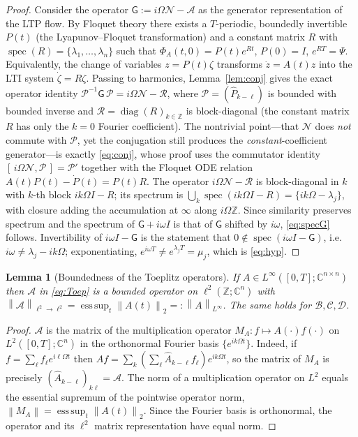 \documentclass{amsart}
\newtheorem{lemma}{Lemma}
\theoremstyle{definition}
\DeclareMathOperator{\spec}{spec}
\DeclareMathOperator{\diag}{diag}
\newcommand{\C}{\mathbb{C}}
\newcommand{\Z}{\mathbb{Z}}
\newcommand{\norm}[1]{\left\lVert#1\right\rVert}
\newcommand{\Acal}{\mathcal{A}}
\newcommand{\Bcal}{\mathcal{B}}
\newcommand{\Ccal}{\mathcal{C}}
\newcommand{\Dcal}{\mathcal{D}}
\newcommand{\Ncal}{\mathcal{N}}
\begin{document}
\begin{proof}
Consider the operator $\mathsf G:=i\Omega\Ncal-\Acal$ as the generator
representation of the LTP flow. By Floquet theory there exists a $T$-periodic,
boundedly invertible $P(t)$ (the Lyapunov–Floquet transformation) and a
constant matrix $R$ with $\spec(R)=\{\lambda_1,\dots,\lambda_n\}$ such that
$\Phi_A(t,0)=P(t)e^{Rt}$, $P(0)=I$, $e^{RT}=\Psi$. Equivalently, the change of
variables $z=P(t)\zeta$ transforms $\dot z=A(t)z$ into the LTI system
$\dot\zeta=R\zeta$. Passing to harmonics, Lemma~\ref{lem:conj} gives the exact
operator identity $\mathcal P^{-1}\mathsf G\,\mathcal P=i\Omega\Ncal-\mathcal R$,
where $\mathcal P=(\hat P_{k-\ell})$ is bounded with bounded inverse and
$\mathcal R=\diag(R)_{k\in\Z}$ is block-diagonal (the constant matrix $R$ has
only the $k=0$ Fourier coefficient). The nontrivial point---that $\Ncal$ does
\emph{not} commute with $\mathcal P$, yet the conjugation still produces the
\emph{constant}-coefficient generator---is exactly \eqref{eq:conj}, whose proof
uses the commutator identity $[\,i\Omega\Ncal,\mathcal P\,]=\mathcal P'$ together
with the Floquet ODE relation $A(t)P(t)-\dot P(t)=P(t)R$. The operator $i\Omega\Ncal-\mathcal R$ is
block-diagonal in $k$ with $k$-th block $ik\Omega I-R$; its spectrum is
$\bigcup_k\spec(ik\Omega I-R)=\{ik\Omega-\lambda_j\}$, with closure adding the
accumulation at $\infty$ along $i\Omega\Z$. Since similarity preserves spectrum
and the spectrum of $\mathsf G+i\omega I$ is that of $\mathsf G$ shifted by
$i\omega$, \eqref{eq:specG} follows. Invertibility of
$i\omega I-\mathsf G$ is the statement that $0\notin\spec(i\omega I-\mathsf G)$,
i.e. $i\omega\ne\lambda_j-ik\Omega$; exponentiating, $e^{i\omega T}\ne
e^{\lambda_j T}=\mu_j$, which is \eqref{eq:hyp}.
\end{proof}

\begin{lemma}[Boundedness of the Toeplitz operators]\label{lem:bounded}
If $A\in L^\infty([0,T];\C^{n\times n})$ then $\Acal$ in \eqref{eq:Toep} is a
bounded operator on $\ell^2(\Z;\C^n)$ with
$\norm{\Acal}_{\ell^2\to\ell^2}=\operatorname*{ess\,sup}_{t}\norm{A(t)}_2
=:\norm{A}_{L^\infty}$. The same holds for $\Bcal,\Ccal,\Dcal$.
\end{lemma}

\begin{proof}
$\Acal$ is the matrix of the multiplication operator
$M_A:f\mapsto A(\cdot)f(\cdot)$ on $L^2([0,T];\C^n)$ in the orthonormal Fourier
basis $\{e^{ik\Omega t}\}$. Indeed, if $f=\sum_\ell f_\ell e^{i\ell\Omega t}$
then $Af=\sum_k(\sum_\ell\hat A_{k-\ell}f_\ell)e^{ik\Omega t}$, so the matrix of
$M_A$ is precisely $(\hat A_{k-\ell})_{k\ell}=\Acal$. The norm of a
multiplication operator on $L^2$ equals the essential supremum of the pointwise
operator norm, $\norm{M_A}=\operatorname*{ess\,sup}_t\norm{A(t)}_2$. Since the
Fourier basis is orthonormal, the operator and its $\ell^2$ matrix
representation have equal norm.
\end{proof}
\end{document}
